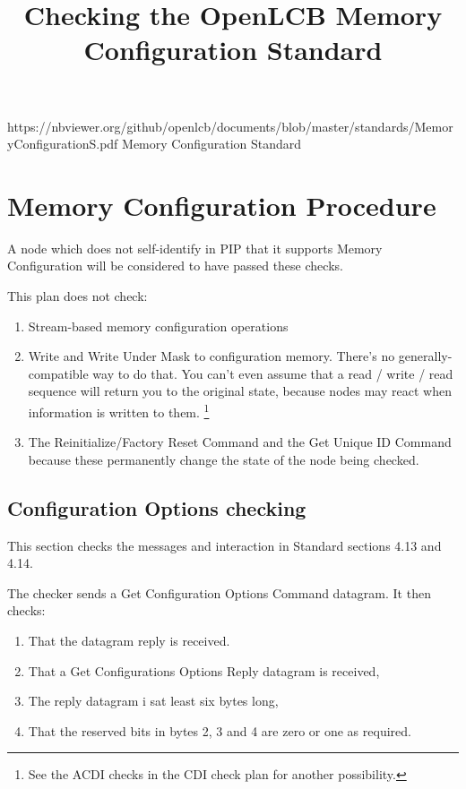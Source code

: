 

\title{Checking the OpenLCB Memory Configuration Standard}


\maketitle

\introductionCaveats
    {https://nbviewer.org/github/openlcb/documents/blob/master/standards/MemoryConfigurationS.pdf}
    {Memory Configuration Standard}

\section{Memory Configuration Procedure}


A node which does not self-identify in PIP that it supports
Memory Configuration will be considered to have passed these checks.
\pipsetFootnote

This plan does not check:
\begin{enumerate}
\item Stream-based memory configuration operations
\item Write and Write Under Mask to configuration memory.  
There's no generally-compatible way to do that.
You can't even assume that a read / write / read sequence will return you to the original
state, because nodes may react when information is written to them.
\footnote{See the ACDI checks in the CDI check plan for another possibility.}
\item The Reinitialize/Factory Reset Command and the Get Unique ID Command
because these permanently change the state of the node being checked.
\end{enumerate}

\subsection{Configuration Options checking}

This section checks the messages and interaction in Standard sections 4.13 and 4.14.

The checker sends a Get Configuration Options Command datagram.  It then checks:
\begin{enumerate}
\item That the datagram reply is received.
\item That a Get Configurations Options Reply datagram is received,
\item The reply datagram i sat least six bytes long,
\item That the reserved bits in bytes 2, 3 and 4 are zero or one as required.
\end{enumerate}

